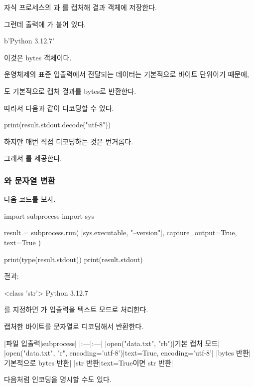 자식 프로세스의 과 를 캡처해 결과 객체에 저장한다.

그런데 출력에 가 붙어 있다.

\begin{dhkzsh}
b'Python 3.12.7\n'
\end{dhkzsh}

이것은 bytes 객체이다.

운영체제의 표준 입출력에서 전달되는 데이터는 기본적으로 바이트 단위이기 때문에,

도 기본적으로 캡처 결과를 bytes로 반환한다.

따라서 다음과 같이 디코딩할 수 있다.

\begin{dhkcode}
print(result.stdout.decode("utf-8"))
\end{dhkcode}

하지만 매번 직접 디코딩하는 것은 번거롭다.

그래서 를 제공한다.

\subsubsection{와 문자열 변환}

다음 코드를 보자.

\begin{dhkcode}
import subprocess
import sys

result = subprocess.run(
    [sys.executable, "--version"],
    capture_output=True,
    text=True
)

print(type(result.stdout))
print(result.stdout)
\end{dhkcode}

결과:

\begin{dhkzsh}
<class 'str'>
Python 3.12.7
\end{dhkzsh}

를 지정하면 가 입출력을 텍스트 모드로 처리한다.

캡처한 바이트를 문자열로 디코딩해서 반환한다.

\begin{dhktable}
|파일 입출력|subprocess|
|:---|:---|
|open("data.txt", "rb")|기본 캡처 모드|
|open("data.txt", "r", encoding='utf-8')|text=True, encoding='utf-8'|
|bytes 반환|기본적으로 bytes 반환|
|str 반환|text=True이면 str 반환|
\end{dhktable}

다음처럼 인코딩을 명시할 수도 있다.

